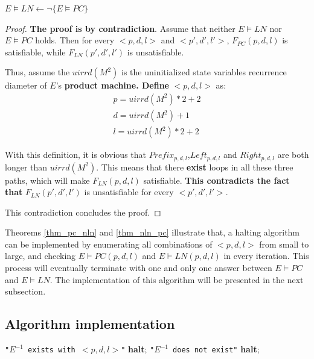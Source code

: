 \documentclass[journal]{IEEEtran}
\begin{document}
\begin{theorem}[]\label{thm_nln_pc}
$E\vDash LN\gets \neg \{E\vDash PC\}$
\end{theorem}
\begin{proof}
\textbf{The proof is by contradiction}.
Assume that neither $E\vDash LN$ nor $E\vDash PC$ holds.
Then for every $<p,d,l>$ and $<p',d',l'>$,
$F_{PC}(p,d,l)$ is satisfiable,
while $F_{LN}(p',d',l')$ is unsatisfiable.

Thus,
assume the $uirrd(M^2)$ is the uninitialized state variables recurrence diameter of $E$'s \textbf{product machine.
Define} $<p,d,l>$ as:
\begin{equation}
\begin{array}{c}
p=uirrd(M^2)*2+2 \\
d=uirrd(M^2)+1 \\
l=uirrd(M^2)*2+2
\end{array}
\end{equation}

With this definition,
it is obvious that $Prefix_{p,d,l}$,$Left_{p,d,l}$ and $Right_{p,d,l}$ are both longer than $uirrd(M^2)$.
This means that there \textbf{exist} loops in all these three paths,
which will make $F_{LN}(p,d,l)$ satisfiable.
\textbf{This contradicts the fact that} $F_{LN}(p',d',l')$ is unsatisfiable for every $<p',d',l'>$.

This contradiction concludes the proof.
\end{proof}

Theorems \ref{thm_pc_nln} and \ref{thm_nln_pc} illustrate that,
a halting algorithm can be implemented by
enumerating all combinations of $<p,d,l>$ from small to large,
and checking $E\vDash PC(p,d,l)$ and $E\vDash LN(p,d,l)$ in every iteration.
This process will eventually terminate with one and only one answer between $E\vDash PC$ and $E\vDash LN$.
The implementation of this algorithm will be presented in the next subsection.

\subsection{Algorithm implementation}\label{subsec_algoimp}

\begin{algorithm}
\caption{$check\_PCLN$}
\label{algo_pcln}
\begin{algorithmic}[1]
        \PRINT \texttt{"$E^{-1}$ exists with $<p,d,l>$"}\label{lab_pc}
        \STATE \textbf{halt};
        \PRINT \texttt{"$E^{-1}$ does not exist"}\label{lab_ln}
        \STATE \textbf{halt};
      \ENDIF
\ENDFOR
\end{algorithmic}
\end{algorithm}
\end{document}
